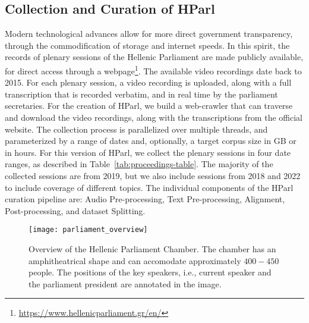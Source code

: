 \documentclass[journal]{IEEEtran}
\begin{document}

\subsection{Collection and Curation of HParl}
\label{sec:hparl-collection}

Modern technological advances allow for more direct government transparency, through the commodification of storage and internet speeds. In this spirit, the records of plenary sessions of the Hellenic Parliament are made publicly available, for direct access through a webpage\footnote{\url{https://www.hellenicparliament.gr/en/}}. The available video recordings date back to 2015.
For each plenary session, a video recording is uploaded, along with a full transcription that is recorded verbatim, and in real time by the parliament secretaries.
For the creation of HParl, we build a web-crawler that can traverse and download the video recordings, along with the transcriptions from the official website.
The collection process is parallelized over multiple threads, and parameterized by a range of dates and, optionally, a target corpus size in GB or in hours. For this version of HParl, we collect the plenary sessions in four date ranges, as described in Table~\ref{tab:proceedings-table}. The majority of the collected sessions are from 2019, but we also include sessions from 2018 and 2022 to include coverage of different topics.
The individual components of the HParl curation pipeline are: Audio Pre-processing, Text Pre-processing, Alignment, Post-processing, and dataset Splitting.



\begin{figure}
    \centering
    \texttt{[image: parliament\_overview]}
    \caption{Overview of the Hellenic Parliament Chamber. The chamber has an amphitheatrical shape and can accomodate approximately $400-450$ people. The positions of the key speakers, i.e., current speaker and the parliament president are annotated in the image.}
    \label{fig:parliament-chamber}
\end{figure}
\end{document}

